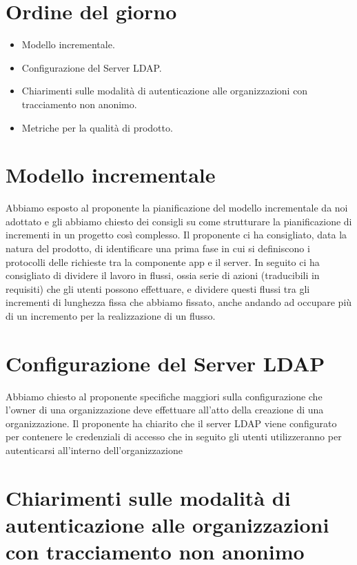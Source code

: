 \documentclass{article}
\begin{document}
\section{Ordine del giorno}%
\label{sec:ordine_del_giorno}

\begin{itemize}
  \item Modello incrementale.
  \item Configurazione del Server LDAP\@.
  \item Chiarimenti sulle modalità di autenticazione alle organizzazioni con tracciamento non anonimo.
  \item Metriche per la qualità di prodotto.
\end{itemize}

\section{Modello incrementale}%
\label{sec:modello_incrementale}

Abbiamo esposto al proponente la pianificazione del modello incrementale da noi adottato e gli abbiamo chiesto dei consigli su come strutturare la pianificazione di incrementi in un progetto così complesso. Il proponente ci ha consigliato, data la natura del prodotto, di identificare una prima fase in cui si definiscono i protocolli delle richieste tra la componente app e il server. In seguito ci ha consigliato di dividere il lavoro in flussi, ossia serie di azioni (traducibili in requisiti) che gli utenti possono effettuare, e dividere questi flussi tra gli incrementi di lunghezza fissa che abbiamo fissato, anche andando ad occupare più di un incremento per la realizzazione di un flusso.

\section{Configurazione del Server LDAP}%
\label{sec:obiettivi_in_uscita_alla_RQ}

Abbiamo chiesto al proponente specifiche maggiori sulla configurazione che l'owner di una organizzazione deve effettuare all'atto della creazione di una organizzazione. Il proponente ha chiarito che il server LDAP viene configurato per contenere le credenziali di accesso che in seguito gli utenti utilizzeranno per autenticarsi all'interno dell'organizzazione

\section{Chiarimenti sulle modalità di autenticazione alle organizzazioni con tracciamento non anonimo}%
\label{sec:chiarimenti_su_verifica}
\end{document}
